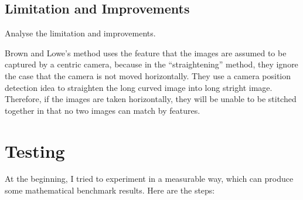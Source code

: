 \documentclass[10pt,twocolumn,letterpaper]{article}
\begin{document}
\subsection{Limitation and Improvements}
Analyse the limitation and improvements.

Brown and Lowe's method uses the feature that the images are assumed to be captured by a centric camera,
because in the ``straightening'' method, they ignore the case that the camera is not moved horizontally.
They use a camera position detection idea to straighten the long curved image into long stright image.
Therefore, if the images are taken horizontally, they will be unable to be stitched together in that no two images can match by features.



\section{Testing}
At the beginning, I tried to experiment in a measurable way, which can produce some mathematical benchmark results. Here are the steps:
\end{document}
